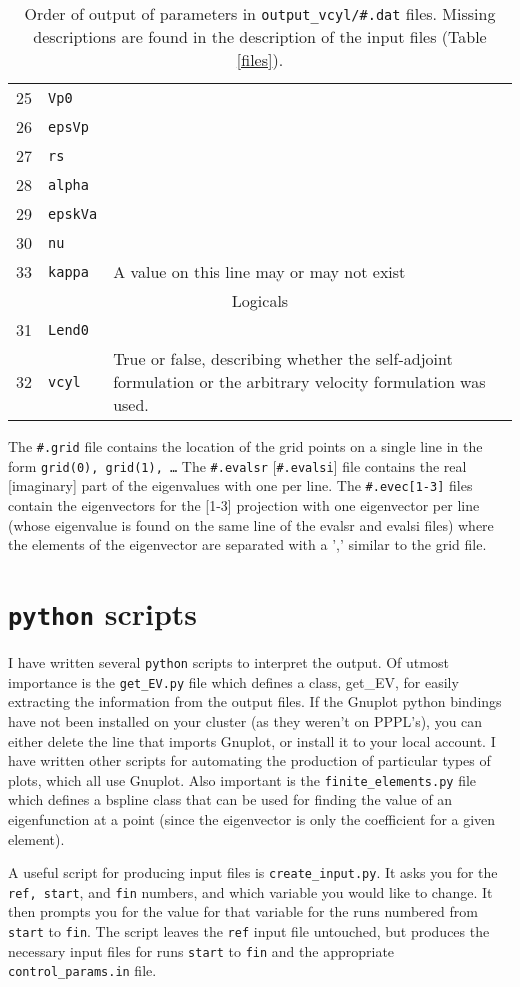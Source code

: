 \documentclass[letterpaper]{article}
\newcommand{\ttt}[1]{\texttt{#1}}
\begin{document}
\begin{table}
\begin{tabular}{|l|l|p{2.9in}|}
25&\ttt{Vp0} & \\
26&\ttt{epsVp} & \\
27&\ttt{rs} & \\
28&\ttt{alpha} & \\
29&\ttt{epskVa} & \\
30&\ttt{nu} & \\
33&\ttt{kappa} & A value on this line may or may not exist\\
\hline
\hline
\multicolumn{3}{|c|}{Logicals} \\
\hline
31&\ttt{Lend0} & \\
32&\ttt{vcyl} & True or false, describing whether the self-adjoint formulation or the arbitrary velocity formulation was used. \\
\hline
\end{tabular}
\caption{Order of output of parameters in \ttt{output\_vcyl/\#.dat} files.  Missing descriptions are found in the description of the input files (Table \ref{files}).\label{dat}}
\end{table}

The \ttt{\#.grid} file contains the location of the grid points on a single line in the form \ttt{grid(0), grid(1),  \ldots }  The \ttt{\#.evalsr} [\ttt{\#.evalsi}] file contains the real [imaginary] part of the eigenvalues with one per line.  The \ttt{\#.evec[1-3]} files contain the eigenvectors for the [1-3] projection with one eigenvector per line (whose eigenvalue is found on the same line of the evalsr and evalsi files) where the elements of the eigenvector are separated with a ',' similar to the grid file.  
\section{\ttt{python} scripts}
I have written several \ttt{python} scripts to interpret the output.  Of utmost importance is the \ttt{get\_EV.py} file which defines a class, get\_EV, for easily extracting the information from the output files.  If the Gnuplot python bindings have not been installed on your cluster (as they weren't on PPPL's), you can either delete the line that imports Gnuplot, or install it to your local account.  I have written other scripts for automating the production of particular types of plots, which all use Gnuplot.  Also important is the \ttt{finite\_elements.py} file which defines a bspline class that can be used for finding the value of an eigenfunction at a point (since the eigenvector is only the coefficient for a given element).  

A useful script for producing input files is \ttt{create\_input.py}.  It asks you for the \ttt{ref, start}, and \ttt{fin} numbers, and which variable you would like to change.  It then prompts you for the value for that variable for the runs numbered from \ttt{start} to \ttt{fin}.  The script leaves the \ttt{ref} input file untouched, but produces the necessary input files for runs \ttt{start} to \ttt{fin} and the appropriate \ttt{control\_params.in} file.  


\end{document}

